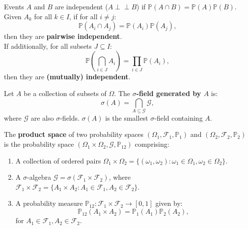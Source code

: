 \documentclass{huhtakm-template-book-v2}
\newcommand{\independent}{\perp\!\!\!\perp}
\newcommand{\prob}{\mathbb{P}}
\begin{document}
    \begin{sdefn}
        Events $A$ and $B$ are independent ($A \independent B$) if $\prob(A \cap B) = \prob(A)\prob(B)$.\\
        Given $A_{k}$ for all $k \in I$, if for all $i \neq j$:
        \begin{equation*}
            \prob(A_{i} \cap A_{j}) = \prob(A_{i})\prob(A_{j}),
        \end{equation*} 
        then they are \textbf{pairwise independent}.\\
        If additionally, for all subsets $J \subseteq I$:
        \begin{equation*}
            \prob\left(\bigcap_{i \in J}A_{i}\right) = \prod_{i \in J}\prob(A_{i}),
        \end{equation*}
        then they are \textbf{(mutually) independent}.
    \end{sdefn}
    \begin{sdefn}
        Let $A$ be a collection of subsets of $\Omega$. The \textbf{$\sigma$-field generated by $A$} is:
        \begin{equation*}
            \sigma(A) = \bigcap_{A \subseteq \mathcal{G}}\mathcal{G},
        \end{equation*}
        where $\mathcal{G}$ are also $\sigma$-fields. $\sigma(A)$ is the smallest $\sigma$-field containing $A$.
    \end{sdefn}
    \begin{sdefn}
        The \textbf{product space} of two probability spaces $(\Omega_{1}, \mathcal{F}_{1}, \prob_{1})$ and $(\Omega_{2}, \mathcal{F}_{2}, \prob_{2})$ is the probability space $(\Omega_{1} \times \Omega_{2}, \mathcal{G}, \prob_{12})$ comprising:
        \begin{enumerate}
            \item A collection of ordered pairs $\Omega_{1} \times \Omega_{2} = \{(\omega_{1}, \omega_{2}) : \omega_{1} \in \Omega_{1}, \omega_{2} \in \Omega_{2}\}$.
            \item A $\sigma$-algebra $\mathcal{G} = \sigma(\mathcal{F}_{1} \times \mathcal{F}_{2})$, where $\mathcal{F}_{1} \times \mathcal{F}_{2} = \{A_{1} \times A_{2} : A_{1} \in \mathcal{F}_{1}, A_{2} \in \mathcal{F}_{2}\}$.
            \item A probability measure $\prob_{12} : \mathcal{F}_{1} \times \mathcal{F}_{2} \to [0,1]$ given by:
            \begin{equation*}
                \prob_{12}(A_{1} \times A_{2}) = \prob_{1}(A_{1})\prob_{2}(A_{2}),
            \end{equation*}
            for $A_{1} \in \mathcal{F}_{1}, A_{2} \in \mathcal{F}_{2}$.
        \end{enumerate}
    \end{sdefn}
\end{document}
